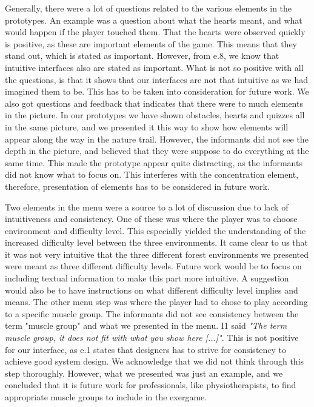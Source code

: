 Generally, there were a lot of questions related to the various elements in the prototypes. An example was a question about what the hearts meant, and what would happen if the player touched them. That the hearts were observed quickly is positive, as these are important elements of the game. This means that they stand out, which is stated as important. However, from e.8, we know that intuitive interfaces also are stated as important. What is not so positive with all the questions, is that it shows that our interfaces are not that intuitive as we had imagined them to be. This has to be taken into consideration for future work. We also got questions and feedback that indicates that there were to much elements in the picture. In our prototypes we have shown obstacles, hearts and quizzes all in the same picture, and we presented it this way to show how elements will appear along the way in the nature trail. However, the informants did not see the depth in the picture, and believed that they were suppose to do everything at the same time. This made the prototype appear quite distracting, as the informants did not know what to focus on. This interferes with the concentration element, therefore, presentation of elements has to be considered in future work. 

Two elements in the menu were a source to a lot of discussion due to lack of intuitiveness and consistency. One of these was where the player was to choose environment and difficulty level. This especially yielded the understanding of the increased difficulty level between the three environments. It came clear to us that it was not very intuitive that the three different forest environments we presented were meant as three different difficulty levels. Future work would be to focus on including textual information to make this part more intuitive. A suggestion would also be to have instructions on what different difficulty level implies and means. The other menu step was where the player had to chose to play according to a specific muscle group. The informants did not see consistency between the term "muscle group" and what we presented in the menu. I1 said \emph{"The term muscle group, it does not fit with what you show here [...]"}. This is not positive for our interface, as e.1 states that designers has to strive for consistency to achieve good system design. We acknowledge that we did not think through this step thoroughly. However, what we presented was just an example, and we concluded that it is future work for professionals, like physiotherapists, to find appropriate muscle groups to include in the exergame.


